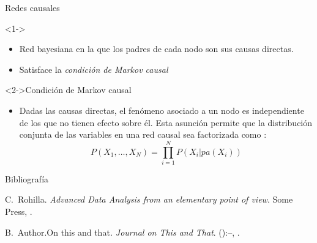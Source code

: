 \documentclass{beamer}
\begin{document}
\begin{frame}{Redes causales}
   \begin{block}
        <1->{}
            \begin{itemize}
                \item Red bayesiana en la que los padres de cada nodo son sus causas directas.
                \item Satisface la {\em condición de Markov causal}
            \end{itemize}
    \end{block}
    \begin{exampleblock}
        <2->{Condición de Markov causal}
            \begin{itemize}
                \item Dadas las causas directas, el fenómeno asociado a un nodo es independiente de 
                los que no tienen efecto sobre él. Esta asunción permite que la distribución 
                conjunta de las variables en una red causal sea factorizada como :
                $$ P(X_{1}, \dots,X_{N}) = \prod_{i=1}^{N} P(X_{i} | pa(X_{i}))$$ 
            \end{itemize}
    \end{exampleblock}
\end{frame}

\begin{frame}{Bibliografía}
	\begin{thebibliography}{2}
		\beamertemplatebookbibitems
		C.\ Rohilla. \newblock\emph{Advanced Data Analysis from an elementary point of view}.\newblock
\textlatin{Some Press, }.

		\beamertemplatearticlebibitems
		B.\ Author.\newblock On this and that\emph{.}
\newblock\emph{Journal on This and That}. 
():--, 
.
	\end{thebibliography}
\end{frame}

\end{document}
